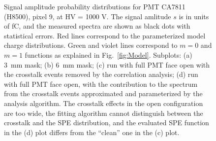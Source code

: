 \begin{figure}[hbt]
  \caption{Signal amplitude probability distributions for PMT CA7811 (H8500), pixel 9, at HV = 1000 V. The signal amlitude $s$ is in units of fC, and the measured spectra are shown as black dots with statistical errors. Red lines correspond to the parameterized model charge distributions. Green and violet lines correspond to $m=0$ and $m=1$ functions as explained in Fig.~\ref{fig:Model}. Subplots: (a) 3~mm mask; (b) 6~mm mask; (c) run with full PMT face open with the crosstalk events removed by the correlation analysis; (d) run with full PMT face open, with the contribution to the spectrum from the crosstalk events approximated and parameterized by the analysis algorithm. The crosstalk effects in the open configuration are too wide, the fitting algorithm cannot distinguish between the crosstalk and the SPE distribution, and the evaluated SPE function in the (d) plot differs from the ``clean'' one in the (c) plot.
    }
\label{fig:CA7811}
\end{figure}

